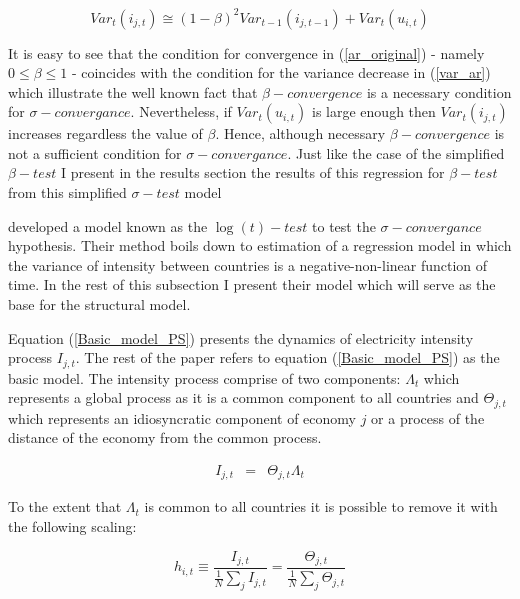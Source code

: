 \documentclass[]{amsart}
\begin{document}
\begin{equation}
Var_{t}(i_{j,t}) \cong (1-\beta)^2Var_{t-1}(i_{j,t-1})+Var_{t}(u_{i,t}) \label{var_ar}
\end{equation}

\bigskip

It is easy to see that the condition for convergence in (\ref{ar_original}) - namely $0 \leq \beta \leq 1$ - coincides with the condition for the variance decrease in (\ref{var_ar}) which illustrate the well known fact that $\beta-convergence$ is a necessary condition for $\sigma-convergance$. Nevertheless, if $Var_{t}(u_{i,t})$ is large enough then $Var_{t}(i_{j,t})$ increases regardless the value of $\beta$. Hence, although necessary $\beta-convergence$ is not a sufficient condition for $\sigma-convergance$. Just like the case of the simplified $\beta-test$ I present in the results section the results of this regression for $\beta-test$ from this simplified $\sigma-test$ model

\bigskip

\cite{PhillipsSul2007} developed a model known as the $\log(t)-test$ to test the $\sigma-convergance$ hypothesis. Their method boils down to estimation of a regression model in which the variance of intensity between countries is a negative-non-linear function of time. In the rest of this subsection I present their model which will serve as the base for the structural model.

\bigskip

Equation (\ref{Basic_model_PS}) presents the dynamics of electricity intensity process $I_{j,t}$. The rest of the paper refers to equation (\ref{Basic_model_PS}) as the basic model. The intensity process comprise of two components: $\Lambda_{t}$ which represents a global process as it is a common component  to all countries and $\Theta_{j,t}$ which represents an idiosyncratic component of economy $j$ or a process of the distance of the economy from the common process.

\begin{eqnarray}
I_{j,t} &=& \Theta_{j,t} \Lambda_{t}
\label{Basic_model_PS}
\end{eqnarray}

\bigskip

To the extent that $\Lambda_{t}$ is common to all countries it is possible to remove it with the following scaling:

\begin{equation}
h_{i,t} \equiv \frac{I_{j,t}}{\frac{1}{N}\sum_j{I_{j,t}}} = \frac{\Theta_{j,t}}{\frac{1}{N}\sum_j{\Theta_{j,t}}}
\end{equation}
\end{document}
